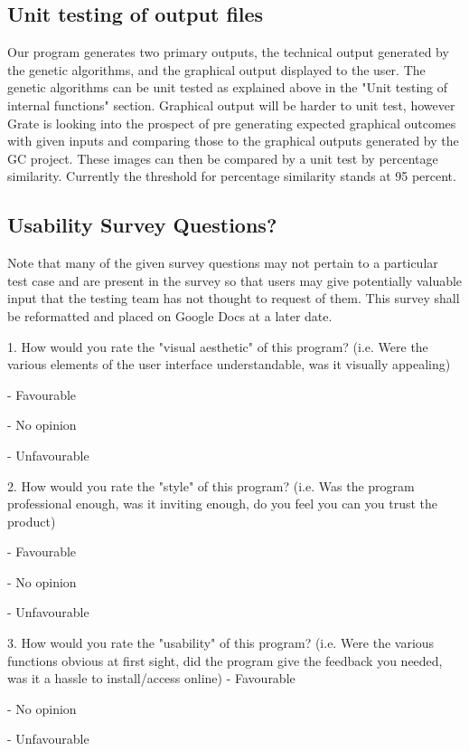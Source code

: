 \documentclass[12pt, titlepage]{article}
\begin{document}
\subsection{Unit testing of output files}		

Our program generates two primary outputs, the technical output generated by the 
genetic algorithms, and the graphical output displayed to the user. The genetic 
algorithms can be unit tested as explained above in the "Unit testing of 
internal functions" section. Graphical output will be harder to unit test, 
however Grate is looking into the prospect of pre generating expected graphical 
outcomes with given inputs and comparing those to the graphical outputs 
generated by the GC project. These images can then be compared by a unit test by 
percentage similarity. Currently the threshold for percentage similarity stands 
at 95 percent.

\newpage

\subsection{Usability Survey Questions?}
Note that many of the given survey questions may not pertain to a particular 
test case and are present in the survey so that users may give potentially 
valuable input that the testing team has not thought to request of them. This 
survey shall be reformatted and placed on Google Docs at a later date.

1. How would you rate the "visual aesthetic" of this program? (i.e. Were the 
various elements of the user interface understandable, was it visually 
appealing)

- Favourable

- No opinion

- Unfavourable

2. How would you rate the "style" of this program? (i.e. Was the program 
professional enough, was it inviting enough,  do you feel you can you trust the 
product)

- Favourable

- No opinion

- Unfavourable

3. How would you rate the "usability" of this program? (i.e. Were the various 
functions obvious at first sight, did the program give the feedback you needed, 
was it a hassle to install/access online)
- Favourable

- No opinion

- Unfavourable
\end{document}
